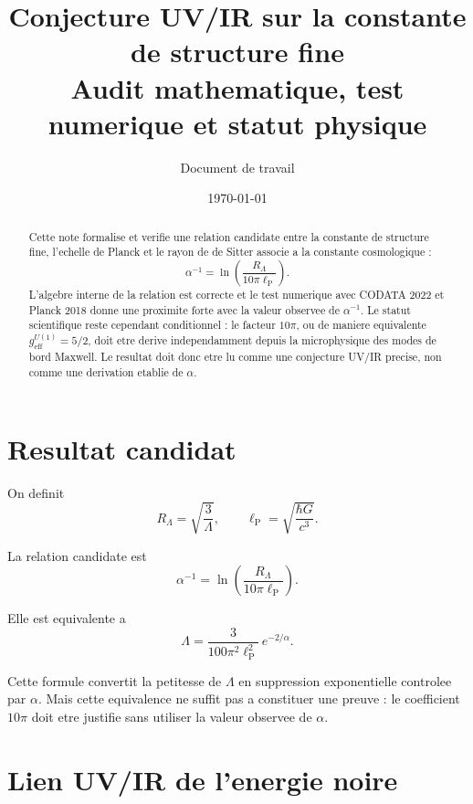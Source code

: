 \documentclass[11pt,a4paper]{article}
\title{Conjecture UV/IR sur la constante de structure fine\\
\large Audit mathematique, test numerique et statut physique}
\author{Document de travail}
\date{\today}
\newcommand{\lP}{\ell_{\mathrm P}}
\newcommand{\RL}{R_{\Lambda}}
\newcommand{\geff}{g_{\mathrm{eff}}^{U(1)}}
\newcommand{\apinv}{\alpha^{-1}}
\begin{document}
\maketitle

\begin{abstract}
Cette note formalise et verifie une relation candidate entre la constante de
structure fine, l'echelle de Planck et le rayon de de Sitter associe a la
constante cosmologique :
\[
\apinv=\ln\left(\frac{\RL}{10\pi\lP}\right).
\]
L'algebre interne de la relation est correcte et le test numerique avec
CODATA 2022 et Planck 2018 donne une proximite forte avec la valeur observee de
\(\alpha^{-1}\). Le statut scientifique reste cependant conditionnel : le
facteur \(10\pi\), ou de maniere equivalente
\(\geff=5/2\), doit etre derive independamment depuis la microphysique des
modes de bord Maxwell. Le resultat doit donc etre lu comme une conjecture
UV/IR precise, non comme une derivation etablie de \(\alpha\).
\end{abstract}

\tableofcontents
\newpage

\section{Resultat candidat}

On definit
\begin{equation}
\RL=\sqrt{\frac{3}{\Lambda}},
\qquad
\lP=\sqrt{\frac{\hbar G}{c^3}}.
\end{equation}

La relation candidate est
\begin{equation}
\boxed{\apinv=\ln\left(\frac{\RL}{10\pi\lP}\right).}
\label{eq:main_alpha}
\end{equation}

Elle est equivalente a
\begin{equation}
\boxed{\Lambda=\frac{3}{100\pi^2\lP^2}\,e^{-2/\alpha}.}
\label{eq:lambda_alpha}
\end{equation}

Cette formule convertit la petitesse de \(\Lambda\) en suppression
exponentielle controlee par \(\alpha\). Mais cette equivalence ne suffit pas a
constituer une preuve : le coefficient \(10\pi\) doit etre justifie sans
utiliser la valeur observee de \(\alpha\).

\section{Lien UV/IR de l'energie noire}
\end{document}
